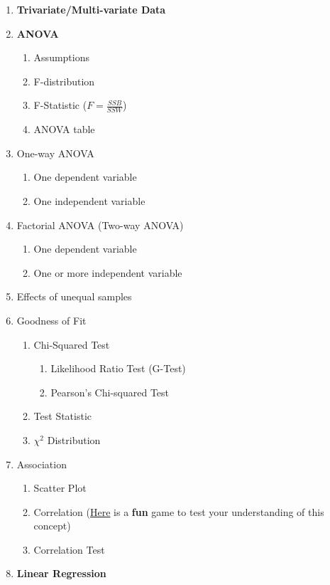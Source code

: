 \documentclass[11pt]{article}
\begin{document}
\begin{enumerate}
\begin{enumerate}
		\end{enumerate}
		\item \textbf{Trivariate/Multi-variate Data}
		\item \textbf{ANOVA}
		\begin{enumerate}
			\item Assumptions
			\item F-distribution
			\item F-Statistic ($F = \frac{SSB}{SSW}$)
			\item ANOVA table
		\end{enumerate}
		\item One-way ANOVA
		\begin{enumerate}
			\item One dependent variable
			\item One independent variable
		\end{enumerate}
		\item Factorial ANOVA (Two-way ANOVA)
		\begin{enumerate}
			\item One dependent variable
			\item One or more independent variable
		\end{enumerate}
		\item Effects of unequal samples
		\item Goodness of Fit
		\begin{enumerate}
			\item Chi-Squared Test
			\begin{enumerate}
				\item Likelihood Ratio Test (G-Test)
				\item Pearson's Chi-squared Test
			\end{enumerate}
			\item Test Statistic
			\item $\chi^2$ Distribution
		\end{enumerate}
		\item Association
		\begin{enumerate}
			\item Scatter Plot
			\item Correlation (\href{http://guessthecorrelation.com/}{Here} is a \textbf{fun} game to test your understanding of this concept)
			\item Correlation Test
		\end{enumerate}
		\item \textbf{Linear Regression}
		\begin{enumerate}

\end{enumerate}
\end{enumerate}
\end{document}
